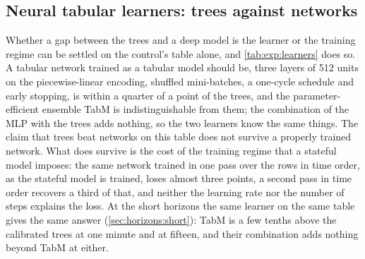 \subsection{Neural tabular learners: trees against networks}
\label{sec:stateless:tabular}

Whether a gap between the trees and a deep model is the learner or the training regime can
be settled on the control's table alone, and \cref{tab:exp:learners} does so.  A tabular
network trained as a tabular model should be, three layers of 512 units on the
piecewise-linear encoding, shuffled mini-batches, a one-cycle schedule and early stopping,
is within a quarter of a point of the trees, and the parameter-efficient ensemble TabM is
indistinguishable from them; the combination of the MLP with the trees adds nothing, so the
two learners know the same things.  The claim that trees beat networks on this table does
not survive a properly trained network.  What does survive is the cost of the training
regime that a stateful model imposes: the same network trained in one pass over the rows
in time order, as the stateful model is trained, loses almost three points, a second pass
in time order recovers a third of that, and neither the learning rate nor the number of
steps explains the loss.  At the short horizons the same learner on the same table gives the
same answer (\cref{sec:horizons:short}): TabM is a few tenths above the calibrated trees at
one minute and at fifteen, and their combination adds nothing beyond TabM at either.

